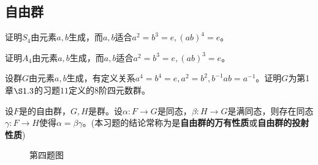 \subsection{自由群}
\begin{prob}
证明$S_{4}$由元素$a,b$生成，而$a,b$适合$a^{2}=b^{3}=e,\left(ab\right)^{4}=e$。
\end{prob}
\begin{prob}
证明$A_{4}$由元素$a,b$生成，而$a,b$适合$a^{2}=b^{3}=e,\left(ab\right)^{3}=e$。
\end{prob}
\begin{prob}
设群$G$由元素$a,b$生成，有定义关系$a^{4}=b^{4}=e,a^{2}=b^{2},b^{-1}ab=a^{-1}$。证明$G$为第1章$\S 1.3$的习题$11$定义的8阶四元数群。
\end{prob}
\begin{prob}
设$F$是的自由群，$G,H$是群。设$\alpha :F\rightarrow G$是同态，$\beta :H\rightarrow G$是满同态，则存在同态$\gamma :F\rightarrow H$使得$\alpha =\beta \gamma $。(本习题的结论常称为是{\bfseries 自由群的万有性质}或{\bfseries 自由群的投射性质})
\end{prob}
\begin{figure}[h]
    \centering
    \caption{第四题图}
\end{figure}